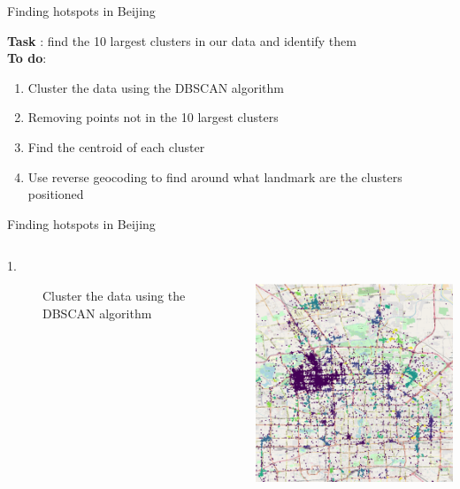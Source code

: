 \documentclass[aspectratio=169]{beamer}
\begin{document}
\begin{frame}{Finding hotspots in Beijing}

{\Large \textbf{Task} : find the 10 largest clusters in our data and identify them}
\vspace{.5cm}
\\
{\Large \textbf{To do}}:
\begin{enumerate}
	\item Cluster the data using the DBSCAN algorithm
	\item Removing points not in the 10 largest clusters
	\item Find the centroid of each cluster
	\item Use reverse geocoding to find around what landmark are the clusters positioned
\end{enumerate}
\end{frame}

\begin{frame}{Finding hotspots in Beijing}
\begin{columns}
\begin{column}{0.5\textwidth}
\begin{description}
	\item [1.] Cluster the data using the DBSCAN algorithm
\end{description}
\end{column}
\begin{column}{0.5\textwidth}  %
     \centering
	\includegraphics[height=7.5cm]{figures/cluttered_map}
\end{column}
\end{columns}
\end{frame}
\end{document}

